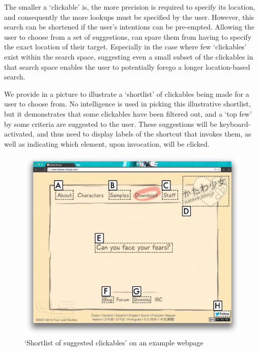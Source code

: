 \documentclass[11pt,openright,a4paper]{report}
\begin{document}
\FloatBarrier
The smaller a `clickable' is, the more precision is required to specify its location, and consequently the more lookups must be specified by the user. However, this search can be shortened if the user's intentions can be pre-empted. Allowing the user to choose from a set of suggestions, can spare them from having to specify the exact location of their target. Especially in the case where few `clickables' exist within the search space, suggesting even a small subset of the clickables in that search space enables the user to potentially forego a longer location-based search.

We provide in  a picture to illustrate a `shortlist' of clickables being made for a user to choose from. No intelligence is used in picking this illustrative shortlist, but it demonstrates that some clickables have been filtered out, and a `top few' by some criteria are suggested to the user. These suggestions will be keyboard-activated, and thus need to display labels of the shortcut that invokes them, as well as indicating which element, upon invocation, will be clicked.

\begin{figure}[ht]
\centering\includegraphics[width=\textwidth]{figures/Suggestions.png}
\caption{`Shortlist of suggested clickables' on an example webpage}
\label{fig:suggestions}
\end{figure}

\end{document}
